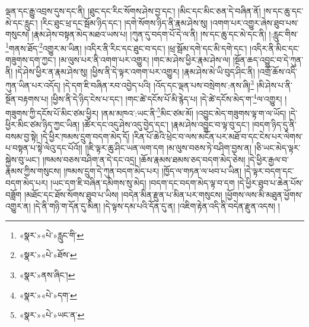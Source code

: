 \documentclass[12pt,a4paper]{book}
\begin{document}
ལྡན་དང་རྒྱུ་འབྲས་དུས་དང་ནི། །ཐུང་དང་རིང་སོགས་ཤེས་བྱ་དང་། །མིང་དང་མིང་ཅན་དེ་བཞིན་ནོ། །ས་དང་ཆུ་དང་མེ་དང་རླུང་། །རིང་ཐུང་ཕྲ་དང་སྦོམ་ཉིད་དང་། །དགེ་སོགས་ཉིད་ནི་རྣམ་ཤེས་སུ། །འགག་པར་འགྱུར་ཞེས་ཐུབ་པས་གསུངས། །རྣམ་ཤེས་བསྟན་མེད་མཐའ་ཡས་པ། །ཀུན་དུ་བདག་པོ་དེ་ལ་ནི། །ས་དང་ཆུ་དང་མེ་དང་ནི། །:རླུང་གིས་\footnote{«སྣར་»«པེ་»རླུང་གི་}གནས་ཐོད་\footnote{«སྣར་»«པེ་»ཐོས་}འགྱུར་མ་ཡིན། །འདིར་ནི་རིང་དང་ཐུང་བ་དང་། །ཕྲ་སྦོམ་དགེ་དང་མི་དགེ་དང་། །འདིར་ནི་མིང་དང་གཟུགས་དག་ཀྱང་། །མ་ལུས་པར་ནི་འགག་པར་འགྱུར། །གང་མ་ཤེས་ཕྱིར་རྣམ་ཤེས་ལ། །སྔོན་ཆད་འབྱུང་བ་དེ་ཀུན་ནི། །དེ་ཤེས་ཕྱིར་ན་རྣམ་ཤེས་སུ། །ཕྱིས་ནི་དེ་ལྟར་འགག་པར་འགྱུར། །རྣམ་ཤེས་མེ་ཡི་བུད་ཤིང་ནི། །འགྲོ་ཆོས་འདི་ཀུན་ཡིན་པར་འདོད། །དེ་དག་ཇི་བཞིན་རབ་འབྱེད་པའི། །འོད་དང་ལྡན་པས་བསྲེགས་:ནས་ཞི།\footnote{«སྣར་»ནས་ཞིང་།} །མི་ཤེས་པ་ནི་སྔོན་བརྟགས་པ། །ཕྱིས་ནི་དེ་ཉིད་ངེས་པ་དང་། །གང་ཚེ་དངོས་པོ་མི་རྙེད་པ། །དེ་ཚེ་དངོས་མེད་ག་\footnote{«སྣར་»«པེ་»དག་}ལ་འགྱུར། །གཟུགས་ཀྱི་དངོས་པོ་མིང་ཙམ་ཕྱིར། །ནམ་མཁའ་:ཡང་ནི་\footnote{«སྣར་»«པེ་»ཡང་ན་}མིང་ཙམ་མོ། །འབྱུང་མེད་གཟུགས་ལྟ་ག་ལ་ཡོད། །དེ་ཕྱིར་མིང་ཙམ་ཉིད་ཀྱང་ཡིན། །ཚོར་དང་འདུ་ཤེས་འདུ་བྱེད་དང་། །རྣམ་ཤེས་འབྱུང་བ་ལྟ་བུ་དང་། །བདག་ཉིད་དུ་ནི་བསམ་བྱ་སྟེ། །དེ་ཕྱིར་ཁམས་དྲུག་བདག་མེད་དོ། །རིན་པོ་ཆེའི་ཕྲེང་བ་ལས་མངོན་པར་མཐོ་བ་དང་ངེས་པར་ལེགས་པ་བསྟན་པ་སྟེ་ལེའུ་དང་པོའོ།། །།ཇི་ལྟར་ཆུ་ཤིང་ཡན་ལག་དག །མ་ལུས་བཅས་ཏེ་བཤིག་བྱས་ན། །ཅི་ཡང་མེད་ལྟར་སྐྱེས་བུ་ཡང་། །ཁམས་བཅས་བཤིག་ན་དེ་དང་འདྲ། །ཆོས་རྣམས་ཐམས་ཅད་བདག་མེད་ཅེས། །དེ་ཕྱིར་རྒྱལ་བ་རྣམས་ཀྱིས་གསུངས། །ཁམས་དྲུག་དེ་ཀུན་བདག་མེད་པར། །ཁྱོད་ལ་གཏན་ལ་ཕབ་པ་ཡིན། །དེ་ལྟར་བདག་དང་བདག་མེད་པར། །ཡང་དག་ཇི་བཞིན་དམིགས་སུ་མེད། །བདག་དང་བདག་མེད་ལྟ་བ་དག །དེ་ཕྱིར་ཐུབ་པ་ཆེན་པོས་བཟློག །མཐོང་དང་ཐོས་སོགས་ཐུབ་པ་ཡིས། །བདེན་མིན་རྫུན་པ་མིན་པར་གསུངས། །ཕྱོགས་ལས་མི་མཐུན་ཕྱོགས་འགྱུར་ན། །དེ་ནི་གཉི་ག་དོན་དུ་མིན། །དེ་ལྟས་དམ་པའི་དོན་དུ་ན། །འཇིག་རྟེན་འདི་ནི་བདེན་རྫུན་འདས། །
\end{document}
